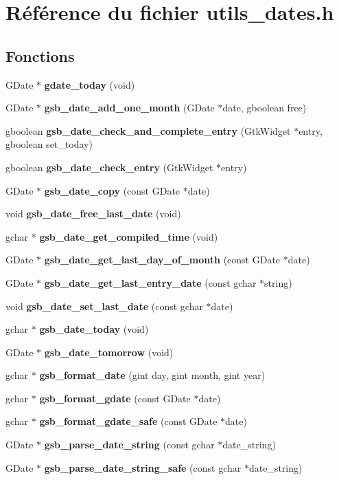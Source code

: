 \section{Référence du fichier utils\_\-dates.h}
\label{utils__dates_8h}
\subsection*{Fonctions}
\begin{DoxyCompactItemize}
\item 
GDate $\ast$ {\bf gdate\_\-today} (void)
\item 
GDate $\ast$ {\bf gsb\_\-date\_\-add\_\-one\_\-month} (GDate $\ast$date, gboolean free)
\item 
gboolean {\bf gsb\_\-date\_\-check\_\-and\_\-complete\_\-entry} (GtkWidget $\ast$entry, gboolean set\_\-today)
\item 
gboolean {\bf gsb\_\-date\_\-check\_\-entry} (GtkWidget $\ast$entry)
\item 
GDate $\ast$ {\bf gsb\_\-date\_\-copy} (const GDate $\ast$date)
\item 
void {\bf gsb\_\-date\_\-free\_\-last\_\-date} (void)
\item 
gchar $\ast$ {\bf gsb\_\-date\_\-get\_\-compiled\_\-time} (void)
\item 
GDate $\ast$ {\bf gsb\_\-date\_\-get\_\-last\_\-day\_\-of\_\-month} (const GDate $\ast$date)
\item 
GDate $\ast$ {\bf gsb\_\-date\_\-get\_\-last\_\-entry\_\-date} (const gchar $\ast$string)
\item 
void {\bf gsb\_\-date\_\-set\_\-last\_\-date} (const gchar $\ast$date)
\item 
gchar $\ast$ {\bf gsb\_\-date\_\-today} (void)
\item 
GDate $\ast$ {\bf gsb\_\-date\_\-tomorrow} (void)
\item 
gchar $\ast$ {\bf gsb\_\-format\_\-date} (gint day, gint month, gint year)
\item 
gchar $\ast$ {\bf gsb\_\-format\_\-gdate} (const GDate $\ast$date)
\item 
gchar $\ast$ {\bf gsb\_\-format\_\-gdate\_\-safe} (const GDate $\ast$date)
\item 
GDate $\ast$ {\bf gsb\_\-parse\_\-date\_\-string} (const gchar $\ast$date\_\-string)
\item 
GDate $\ast$ {\bf gsb\_\-parse\_\-date\_\-string\_\-safe} (const gchar $\ast$date\_\-string)
\end{DoxyCompactItemize}



